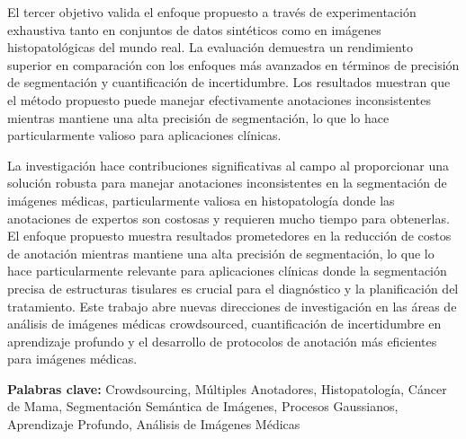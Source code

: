 El tercer objetivo valida el enfoque propuesto a través de
experimentación exhaustiva tanto en conjuntos de datos sintéticos
como en imágenes histopatológicas del mundo real. La evaluación
demuestra un rendimiento superior en comparación con los enfoques más
avanzados en términos de precisión de segmentación y cuantificación
de incertidumbre. Los resultados muestran que el método propuesto
puede manejar efectivamente anotaciones inconsistentes mientras
mantiene una alta precisión de segmentación, lo que lo hace
particularmente valioso para aplicaciones clínicas.

La investigación hace contribuciones significativas al campo al
proporcionar una solución robusta para manejar anotaciones
inconsistentes en la segmentación de imágenes médicas,
particularmente valiosa en histopatología donde las anotaciones de
expertos son costosas y requieren mucho tiempo para obtenerlas. El
enfoque propuesto muestra resultados prometedores en la reducción de
costos de anotación mientras mantiene una alta precisión de
segmentación, lo que lo hace particularmente relevante para
aplicaciones clínicas donde la segmentación precisa de estructuras
tisulares es crucial para el diagnóstico y la planificación del
tratamiento. Este trabajo abre nuevas direcciones de investigación en
las áreas de análisis de imágenes médicas crowdsourced,
cuantificación de incertidumbre en aprendizaje profundo y el
desarrollo de protocolos de anotación más eficientes para imágenes médicas.

\textbf{\small Palabras clave:} Crowdsourcing, Múltiples Anotadores,
Histopatología, Cáncer de Mama, Segmentación Semántica de Imágenes,
Procesos Gaussianos, Aprendizaje Profundo, Análisis de Imágenes Médicas
